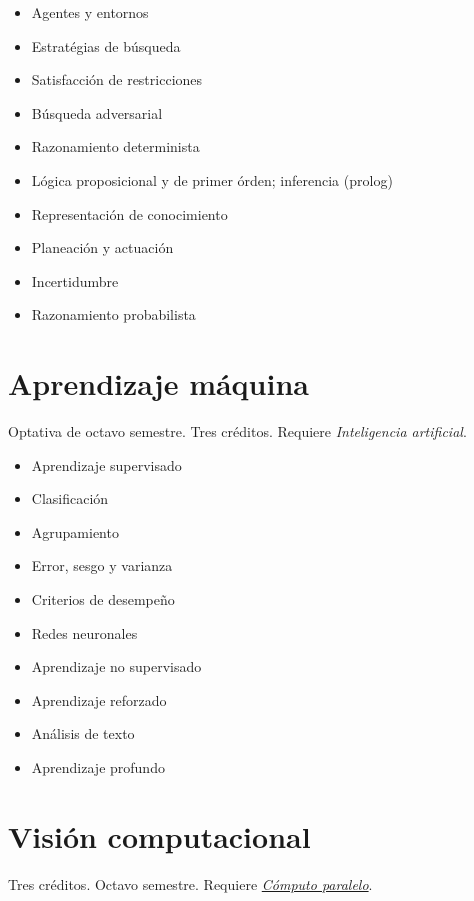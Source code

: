 \documentclass{article}
\begin{document}
\begin{multicols}{4}
\begin{itemize}
\item{Agentes y entornos}
\item{Estrat\'{e}gias de b\'{u}squeda}
\item{Satisfacci\'{o}n de restricciones}
\item{B\'{u}squeda adversarial}
\item{Razonamiento determinista}
\item{L\'{o}gica proposicional y de primer \'{o}rden; inferencia (prolog)}
\item{Representaci\'{o}n de conocimiento}
\item{Planeaci\'{o}n y actuaci\'{o}n}
\item{Incertidumbre}
\item{Razonamiento probabilista}
\end{itemize}

\vfill\null \columnbreak

\hypertarget{am}{\section*{Aprendizaje m\'{a}quina}} 

Optativa de octavo semestre. Tres cr\'{e}ditos. Requiere {\em Inteligencia artificial}.

\begin{itemize}
\item{Aprendizaje supervisado}
\item{Clasificaci\'{o}n}
\item{Agrupamiento}  
\item{Error, sesgo y varianza}
\item{Criterios de desempe\~{n}o}
\item{Redes neuronales}
\item{Aprendizaje no supervisado}
\item{Aprendizaje reforzado}  
\item{An\'{a}lisis de texto}
\item{Aprendizaje profundo}
\end{itemize}

\vfill\null \columnbreak

\hypertarget{vc}{\section*{Visi\'{o}n computacional}} 

Tres cr\'{e}ditos. Octavo semestre. Requiere \hyperlink{cp}{\em
  C\'{o}mputo paralelo}.


\end{multicols}
\end{document}
